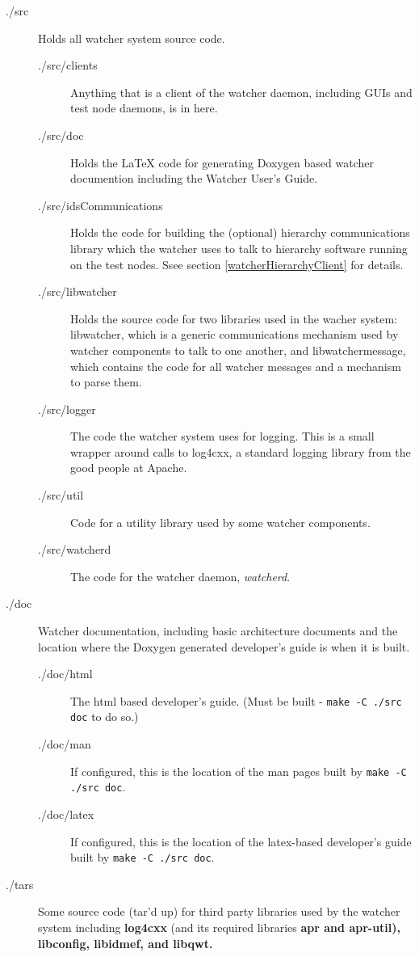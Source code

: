 \documentclass{article}
\begin{document}
\begin{description}
\item[.\slash src] Holds all watcher system source code. 
\begin{description}
\item[.\slash src\slash clients] Anything that is a client of the watcher daemon, including GUIs and test node daemons, is in here. 
\item[.\slash src\slash doc] Holds the \LaTeX{} code for generating Doxygen based watcher documention including the Watcher User's Guide.
\item[.\slash src\slash idsCommunications] Holds the code for building the (optional) hierarchy communications library which the watcher uses to talk to hierarchy software running on the test nodes. 
Ssee section \ref{watcherHierarchyClient} for details.
\item[.\slash src\slash libwatcher] Holds the source code for two libraries used in the wacher system: libwatcher, which is a generic communications mechanism used by watcher components
to talk to one another, and libwatchermessage, which contains the code for all watcher messages and a mechanism to parse them. 
\item[.\slash src\slash logger] The code the watcher system uses for logging. This is a small wrapper around calls to log4cxx, a standard logging library from the good people at Apache. 
\item[.\slash src\slash util] Code for a utility library used by some watcher components. 
\item[.\slash src\slash watcherd] The code for the watcher daemon, {\it watcherd}. 
\end{description}
\item[.\slash doc] Watcher documentation, including basic architecture documents and the location where the Doxygen generated developer's guide is when it is built. 
\begin{description}
\item[.\slash doc\slash html] The html based developer's guide. (Must be built - \vbox{{\tt make -C .\slash src doc}} to do so.)
\item[.\slash doc\slash man] If configured, this is the location of the man pages built by \vbox{{\tt make -C .\slash src doc}}.
\item[.\slash doc\slash latex] If configured, this is the location of the latex-based developer's guide built by 
\vbox{{\tt make -C ./src doc}}.
\end{description}
\item[.\slash tars] Some source code (tar'd up) for third party libraries used by the watcher system including {\bf log4cxx} (and its required libraries \bf{apr} and
\bf{apr-util}), \bf{libconfig}, \bf{libidmef}, and \bf{libqwt}. 
\end{description}
\end{document}
